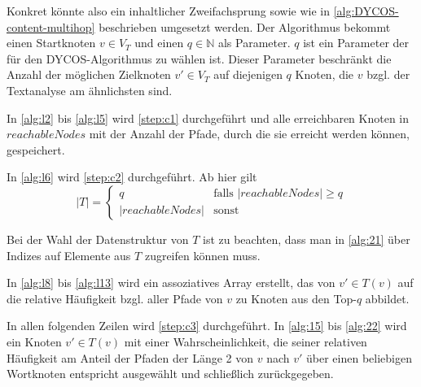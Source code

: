 Konkret könnte also ein inhaltlicher Zweifachsprung sowie wie in
\cref{alg:DYCOS-content-multihop} beschrieben umgesetzt werden.
Der Algorithmus bekommt einen Startknoten $v \in V_T$ und
einen $q \in \mathbb{N}$ als Parameter. $q$ ist ein Parameter der
für den DYCOS-Algorithmus zu wählen ist. Dieser Parameter beschränkt
die Anzahl der möglichen Zielknoten $v' \in V_T$ auf diejenigen
$q$ Knoten, die $v$ bzgl. der Textanalyse am ähnlichsten sind.

In \cref{alg:l2} bis \cref{alg:l5} wird \cref{step:c1} durchgeführt und alle
erreichbaren Knoten in $reachableNodes$ mit der Anzahl der Pfade, durch die sie
erreicht werden können, gespeichert.

In \cref{alg:l6} wird \cref{step:c2} durchgeführt. Ab hier gilt
\[ |T| = \begin{cases}q               &\text{falls } |reachableNodes|\geq q\\
                     |reachableNodes| &\text{sonst }\end{cases}\]

Bei der Wahl der Datenstruktur von $T$ ist zu beachten, dass man in
\cref{alg:21} über Indizes auf Elemente aus $T$ zugreifen können muss.

In \cref{alg:l8} bis \ref{alg:l13} wird ein assoziatives Array erstellt, das
von $v' \in T(v)$ auf die relative Häufigkeit bzgl. aller Pfade von $v$ zu
Knoten aus den Top-$q$ abbildet.

In allen folgenden Zeilen wird \cref{step:c3} durchgeführt. In \cref{alg:15}
bis \cref{alg:22} wird ein Knoten $v' \in T(v)$ mit einer Wahrscheinlichkeit,
die seiner relativen Häufigkeit am Anteil der Pfaden der Länge 2 von $v$ nach
$v'$ über einen beliebigen Wortknoten entspricht ausgewählt und schließlich
zurückgegeben.

